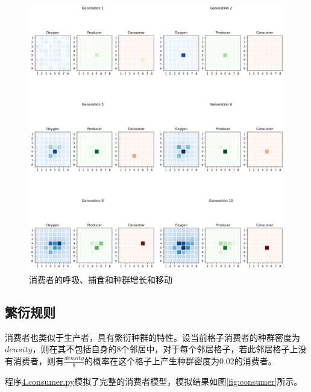 \documentclass{ctexart}
\begin{document}
\begin{figure}[ht]
  \centering
  \includegraphics[width=\textwidth]{consumer-move.png}
  \caption{消费者的呼吸、捕食和种群增长和移动}
  \label{fig:consumer-move}
\end{figure}

\subsection{繁衍规则}

消费者也类似于生产者，具有繁衍种群的特性。设当前格子消费者的种群密度为$density$，则在其不包括自身的8个邻居中，对于每个邻居格子，若此邻居格子上没有消费者，则有$\frac{density}{8}$的概率在这个格子上产生种群密度为0.02的消费者。

程序\underline{4.consumer.py}模拟了完整的消费者模型，模拟结果如图\ref{fig:consumer}所示。
\end{document}
